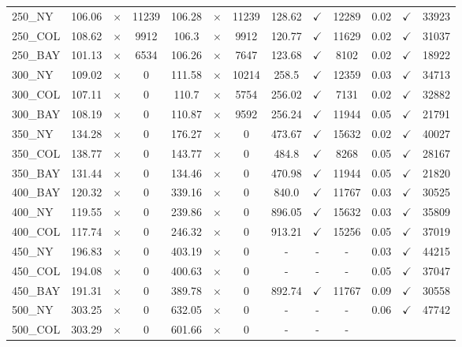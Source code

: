 \documentclass[main.tex]{subfiles}
\begin{document}
\begin{landscape}
\begin{center}
\begin{tabular}{lcccccccccccc}
250\_NY & 106.06 & $\times$ & 11239 & 106.28 & $\times$ & 11239 & 128.62 & $\checkmark$ & 12289 & 0.02 & $\checkmark$ & 33923\\
250\_COL & 108.62 & $\times$ & 9912 & 106.3 & $\times$ & 9912 & 120.77 & $\checkmark$ & 11629 & 0.02 & $\checkmark$ & 31037\\
250\_BAY & 101.13 & $\times$ & 6534 & 106.26 & $\times$ & 7647 & 123.68 & $\checkmark$ & 8102 & 0.02 & $\checkmark$ & 18922\\
300\_NY & 109.02 & $\times$ & 0 & 111.58 & $\times$ & 10214 & 258.5 & $\checkmark$ & 12359 & 0.03 & $\checkmark$ & 34713\\
300\_COL & 107.11 & $\times$ & 0 & 110.7 & $\times$ & 5754 & 256.02 & $\checkmark$ & 7131 & 0.02 & $\checkmark$ & 32882\\
300\_BAY & 108.19 & $\times$ & 0 & 110.87 & $\times$ & 9592 & 256.24 & $\checkmark$ & 11944 & 0.05 & $\checkmark$ & 21791\\
350\_NY & 134.28 & $\times$ & 0 & 176.27 & $\times$ & 0 & 473.67 & $\checkmark$ & 15632 & 0.02 & $\checkmark$ & 40027\\
350\_COL & 138.77 & $\times$ & 0 & 143.77 & $\times$ & 0 & 484.8 & $\checkmark$ & 8268 & 0.05 & $\checkmark$ & 28167\\
350\_BAY & 131.44 & $\times$ & 0 & 134.46 & $\times$ & 0 & 470.98 & $\checkmark$ & 11944 & 0.05 & $\checkmark$ & 21820\\
400\_BAY & 120.32 & $\times$ & 0 & 339.16 & $\times$ & 0 & 840.0 & $\checkmark$ & 11767 & 0.03 & $\checkmark$ & 30525\\
400\_NY & 119.55 & $\times$ & 0 & 239.86 & $\times$ & 0 & 896.05 & $\checkmark$ & 15632 & 0.03 & $\checkmark$ & 35809\\
400\_COL & 117.74 & $\times$ & 0 & 246.32 & $\times$ & 0 & 913.21 & $\checkmark$ & 15256 & 0.05 & $\checkmark$ & 37019\\
450\_NY & 196.83 & $\times$ & 0 & 403.19 & $\times$ & 0 & - & - & - 
 & 0.03 & $\checkmark$ & 44215\\
450\_COL & 194.08 & $\times$ & 0 & 400.63 & $\times$ & 0 & - & - & - 
 & 0.05 & $\checkmark$ & 37047\\
450\_BAY & 191.31 & $\times$ & 0 & 389.78 & $\times$ & 0 & 892.74 & $\checkmark$ & 11767 & 0.09 & $\checkmark$ & 30558\\
500\_NY & 303.25 & $\times$ & 0 & 632.05 & $\times$ & 0 & - & - & - 
 & 0.06 & $\checkmark$ & 47742\\
500\_COL & 303.29 & $\times$ & 0 & 601.66 & $\times$ & 0 & - & - & - 

\end{tabular}
\end{center}
\end{landscape}
\end{document}
